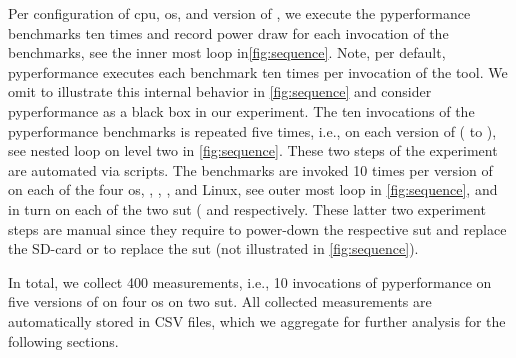 Per configuration of \gls{cpu}, \gls{os}, and version of \python, we execute the \gls{pyperformance} benchmarks ten times and record power draw for each invocation of the benchmarks, see the inner most loop in\autoref{fig:sequence}.
Note, per default, \gls{pyperformance} executes each benchmark ten times per invocation of the tool.
We omit to illustrate this internal behavior in \autoref{fig:sequence} and consider \gls{pyperformance} as a black box in our experiment.
The ten invocations of the \gls{pyperformance} benchmarks is repeated five times, i.e., on each version of \python ( to ), see nested loop on level two in \autoref{fig:sequence}.
These two steps of the experiment are automated via scripts.
The benchmarks are invoked 10 times per version of \python on each of the four \gls{os}, , , , and  Linux, see outer most loop in \autoref{fig:sequence}, and in turn on each of the two \gls{sut} ( and  respectively.
These latter two experiment steps are manual since they require to power-down the respective \gls{sut} and replace the SD-card or to replace the \gls{sut} (not illustrated in \autoref{fig:sequence}).

In total, we collect 400 measurements, i.e., 10 invocations of \gls{pyperformance} on five versions of \python on four \gls{os} on two \gls{sut}.
All collected measurements are automatically stored in CSV files, which we aggregate for further analysis for the following sections.